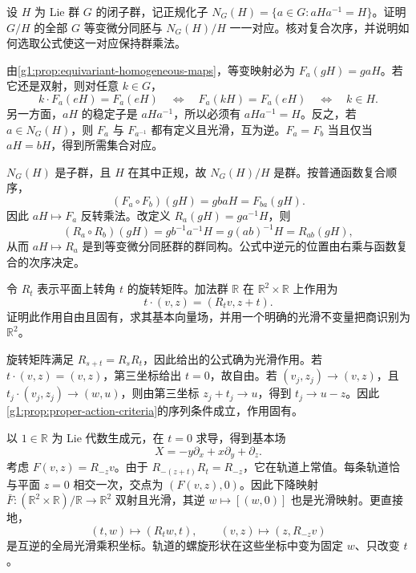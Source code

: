 \begin{exercise}\label{g1:ex:equivariant-automorphisms-normalizer}
	设 \(H\) 为 Lie 群 \(G\) 的闭子群，记正规化子 \(N_G(H)=\{a\in G:aHa^{-1}=H\}\)。证明 \(G/H\) 的全部 \(G\) 等变微分同胚与 \(N_G(H)/H\) 一一对应。核对复合次序，并说明如何选取公式使这一对应保持群乘法。
\end{exercise}
\begin{solution}
	由\cref{g1:prop:equivariant-homogeneous-maps}，等变映射必为 \(F_a(gH)=gaH\)。若它还是双射，则对任意 \(k\in G\)，
	\[
		k\cdot F_a(eH)=F_a(eH)
		\quad\Longleftrightarrow\quad F_a(kH)=F_a(eH)
		\quad\Longleftrightarrow\quad k\in H.
	\]
	另一方面，\(aH\) 的稳定子是 \(aHa^{-1}\)，所以必须有 \(aHa^{-1}=H\)。反之，若 \(a\in N_G(H)\)，则 \(F_a\) 与 \(F_{a^{-1}}\) 都有定义且光滑，互为逆。\(F_a=F_b\) 当且仅当 \(aH=bH\)，得到所需集合对应。

	\(N_G(H)\) 是子群，且 \(H\) 在其中正规，故 \(N_G(H)/H\) 是群。按普通函数复合顺序，
	\[
		(F_a\circ F_b)(gH)=gbaH=F_{ba}(gH).
	\]
	因此 \(aH\mapsto F_a\) 反转乘法。改定义 \(R_a(gH)=ga^{-1}H\)，则
	\[
		(R_a\circ R_b)(gH)=gb^{-1}a^{-1}H
		=g(ab)^{-1}H=R_{ab}(gH),
	\]
	从而 \(aH\mapsto R_a\) 是到等变微分同胚群的群同构。公式中逆元的位置由右乘与函数复合的次序决定。
\end{solution}


\begin{exercise}\label{g1:ex:screw-action-quotient}
	令 \(R_t\) 表示平面上转角 \(t\) 的旋转矩阵。加法群 \(\mathbb R\) 在 \(\mathbb R^2\times\mathbb R\) 上作用为
	\[
		t\cdot(v,z)=(R_tv,z+t).
	\]
	证明此作用自由且固有，求其基本向量场，并用一个明确的光滑不变量把商识别为 \(\mathbb R^2\)。
\end{exercise}
\begin{solution}
	旋转矩阵满足 \(R_{s+t}=R_sR_t\)，因此给出的公式确为光滑作用。若 \(t\cdot(v,z)=(v,z)\)，第三坐标给出 \(t=0\)，故自由。若 \((v_j,z_j)\to(v,z)\)，且 \(t_j\cdot(v_j,z_j)\to(w,u)\)，则由第三坐标 \(z_j+t_j\to u\)，得到 \(t_j\to u-z\)。因此\cref{g1:prop:proper-action-criteria}的序列条件成立，作用固有。

	以 \(1\in\mathbb R\) 为 Lie 代数生成元，在 \(t=0\) 求导，得到基本场
	\[
		X=-y\partial_x+x\partial_y+\partial_z.
	\]
	考虑 \(F(v,z)=R_{-z}v\)。由于 \(R_{-(z+t)}R_t=R_{-z}\)，它在轨道上常值。每条轨道恰与平面 \(z=0\) 相交一次，交点为 \((F(v,z),0)\)。因此下降映射 \(\bar F:(\mathbb R^2\times\mathbb R)/\mathbb R\to\mathbb R^2\) 双射且光滑，其逆 \(w\mapsto[(w,0)]\) 也是光滑映射。更直接地，
	\[
		(t,w)\longmapsto(R_tw,t),\qquad
		(v,z)\longmapsto(z,R_{-z}v)
	\]
	是互逆的全局光滑乘积坐标。轨道的螺旋形状在这些坐标中变为固定 \(w\)、只改变 \(t\)。
\end{solution}

